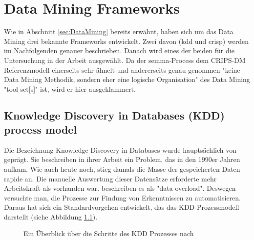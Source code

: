 \chapter{Data Mining Frameworks}\label{sec:DataMiningFrameworks}
Wie in Abschnitt \ref{sec:DataMining} bereits erwähnt, haben sich um das Data Mining drei bekannte Frameworks entwickelt. Zwei davon (\gls{kdd} und \gls{crisp}) werden im Nachfolgenden genauer beschrieben. Danach wird eines der beiden für die Untersuchung in der Arbeit ausgewählt. Da der \gls{semma}-Process dem CRIPS-DM Referenzmodell einerseits sehr ähnelt und andererseits genau genommen "keine Data Mining Methodik, sondern eher eine logische Organisation" des Data Mining "tool set[s]"\citep[eigene Übersetzung]{enterpriseminer_sas_2012} ist, wird er hier ausgeklammert. 

\section{Knowledge Discovery in Databases (KDD) process model}\label{sec:kdd}
Die Bezeichnung Knowledge Discovery in Databases wurde hauptsächlich von \citep{fayyad_data_1996} geprägt. Sie beschreiben in ihrer Arbeit ein Problem, das in den 1990er Jahren aufkam. Wie auch heute noch, stieg damals die Masse der gespeicherten Daten rapide an. Die manuelle Auswertung dieser Datensätze erforderte mehr Arbeitskraft als vorhanden war. \citep[S.~38]{fayyad_data_1996} beschreiben es als "data overload". Deswegen versuchte man, die Prozesse zur Findung von Erkenntnissen zu automatisieren. Daraus hat sich ein Standardvorgehen entwickelt, das das KDD-Prozessmodell darstellt (siehe Abbildung \ref{fig:kddprocess}).
\begin{figure}[H]
\centering
{}
\caption{Ein Überblick über die Schritte des KDD Prozesses nach \citep[S.~41]{fayyad_data_1996}}
\label{fig:kddprocess}
\end{figure}

